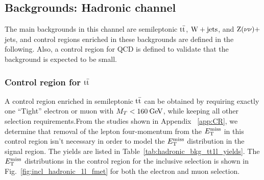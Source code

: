 \subsection{Backgrounds: Hadronic channel}
\label{subsec:bkg_hadronic}

The main backgrounds in this channel are semileptonic $\mathrm{t}\bar{\mathrm{t}}$, $\mathrm{W+jets}$, and $\mathrm{Z}(\nu\nu)+$jets, and control regions enriched in these backgrounds are defined in the following. Also, a control region for QCD is defined to validate that the background is expected to be small.

\subsubsection{Control region for \texorpdfstring{$\mathrm{t}\bar{\mathrm{t}}$}{ttbar}}
\label{subsubsec:bkg_hadronic_ttbar}

A control region enriched in semileptonic $\mathrm{t}\bar{\mathrm{t}}$ can be obtained by requiring exactly one ``Tight'' electron or muon with $M_T<160\:\mathrm{Ge\kern -0.1em V}$, while keeping all other selection requirements.From the studies shown in Appendix ~\ref{app:CR}, we determine that removal of the lepton four-momentum from the $E_\mathrm{T}^{\mathrm{miss}}$ in this control region isn't necessary in order to model the $E_\mathrm{T}^{\mathrm{miss}}$ distribution in the signal region. The yields are listed in Table~\ref{tab:hadronic_bkg_tt1l_yields}. The $E_\mathrm{T}^{\mathrm{miss}}$ distributions in the control region for the inclusive selection is shown in Fig.~\ref{fig:incl_hadronic_1l_fmet} for both the electron and muon selection. 

